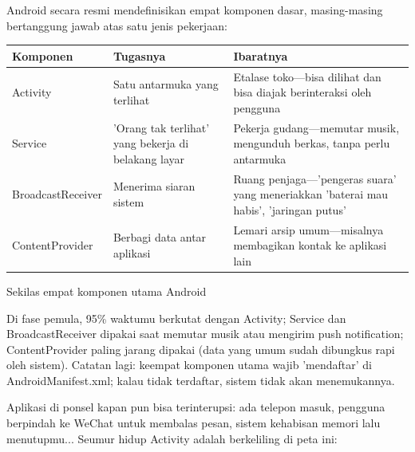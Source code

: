


Android secara resmi mendefinisikan empat komponen dasar, masing-masing bertanggung jawab atas satu jenis pekerjaan:

\begin{center}
\begin{tabularx}{\linewidth}{|X|X|X|}
\hline
\textbf{Komponen} & \textbf{Tugasnya} & \textbf{Ibaratnya} \tabularnewline
\hline
Activity & Satu antarmuka yang terlihat & Etalase toko—bisa dilihat dan bisa diajak berinteraksi oleh pengguna \tabularnewline
Service & 'Orang tak terlihat' yang bekerja di belakang layar & Pekerja gudang—memutar musik, mengunduh berkas, tanpa perlu antarmuka \tabularnewline
BroadcastReceiver & Menerima siaran sistem & Ruang penjaga—'pengeras suara' yang meneriakkan 'baterai mau habis', 'jaringan putus' \tabularnewline
ContentProvider & Berbagi data antar aplikasi & Lemari arsip umum—misalnya membagikan kontak ke aplikasi lain \tabularnewline
\hline
\end{tabularx}
\end{center}

\begin{center}\small\color{gray}Sekilas empat komponen utama Android\end{center}

Di fase pemula, 95\% waktumu berkutat dengan Activity; Service dan BroadcastReceiver dipakai saat memutar musik atau mengirim push notification; ContentProvider paling jarang dipakai (data yang umum sudah dibungkus rapi oleh sistem). Catatan lagi: keempat komponen utama wajib 'mendaftar' di AndroidManifest.xml; kalau tidak terdaftar, sistem tidak akan menemukannya.


Aplikasi di ponsel kapan pun bisa terinterupsi: ada telepon masuk, pengguna berpindah ke WeChat untuk membalas pesan, sistem kehabisan memori lalu menutupmu... Seumur hidup Activity adalah berkeliling di peta ini:

